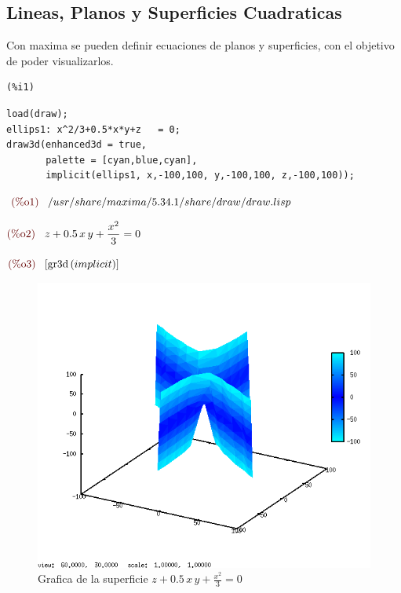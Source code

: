 \documentclass[12pt]{article}
\begin{document}
\subsection{Lineas, Planos y Superficies Cuadraticas}
Con maxima se pueden definir ecuaciones de planos y superficies, con el objetivo de poder visualizarlos.

\begin{minipage}[t]{8ex}{\color{red}\bf
\begin{verbatim}
(%i1) 
\end{verbatim}}
\end{minipage}
\begin{minipage}[t]{\textwidth}{\color{blue}
\begin{verbatim}
load(draw);
ellips1: x^2/3+0.5*x*y+z   = 0;
draw3d(enhanced3d = true,
       palette = [cyan,blue,cyan],
       implicit(ellips1, x,-100,100, y,-100,100, z,-100,100));
\end{verbatim}}
\end{minipage}

\begin{math}\displaystyle
\parbox{8ex}{\color{labelcolor}(\%o1) }
/usr/share/maxima/5.34.1/share/draw/draw.lisp
\end{math}

\begin{math}\displaystyle
\parbox{8ex}{\color{labelcolor}(\%o2) }
z+0.5\,x\,y+\frac{{x}^{2}}{3}=0
\end{math}

\begin{math}\displaystyle
\parbox{8ex}{\color{labelcolor}(\%o3) }
[\mathrm{gr3d}\left( implicit\right) ]
\end{math}
\begin{figure}[H]
\centering
\includegraphics[scale=0.5]{1.png}
\caption{Grafica de la superficie $z+0.5\,x\,y+\frac{{x}^{2}}{3}=0$}
\end{figure}
\end{document}
